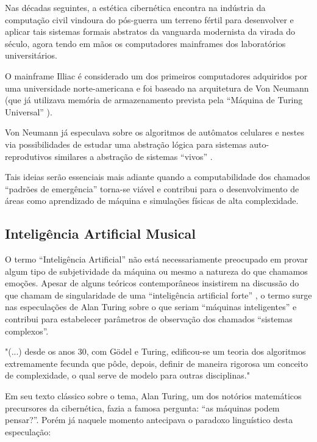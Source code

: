 \documentclass[
	12pt,				%
	openright,			%
	twoside,			%
	a4paper,			%
	english,			%
	french,				%
	spanish,			%
	brazil				%
	]{abntex2}
\begin{document}
Nas décadas seguintes, a estética cibernética encontra na indústria da computação civil vindoura do pós-guerra um terreno fértil para desenvolver e aplicar tais sistemas formais abstratos da vanguarda modernista da virada do século, agora tendo em mãos os computadores mainframes dos laboratórios universitários. 

O mainframe Illiac é considerado um dos primeiros computadores adquiridos por uma universidade norte-americana e foi baseado na arquitetura de Von Neumann (que já utilizava memória de armazenamento prevista pela “Máquina de Turing Universal” ).

Von Neumann já especulava sobre os algoritmos de autômatos celulares e nestes via possibilidades de estudar uma abstração lógica para sistemas auto-reprodutivos similares a abstração de sistemas “vivos” \cite[p. 13]{langton1997artificial}.

Tais ideias serão essenciais mais adiante quando a computabilidade dos chamados “padrões de emergência” torna-se viável e contribui para o desenvolvimento de áreas como aprendizado de máquina e simulações físicas de alta complexidade.

\subsection{Inteligência Artificial Musical}

O termo “Inteligência Artificial” não está necessariamente preocupado em provar algum tipo de subjetividade da máquina ou mesmo a natureza do que chamamos emoções. Apesar de alguns teóricos contemporâneos insistirem na discussão do que chamam de singularidade de uma “inteligência artificial forte”  \cite{kurzweil2005singularity}, o termo surge nas especulações de Alan Turing sobre o que seriam “máquinas inteligentes” \cite{turing1936computable} e contribui para estabelecer parâmetros de observação dos chamados “sistemas complexos”.

\begin{citacao}

"(...) desde os anos 30, com Gödel e Turing, edificou-se um teoria dos algoritmos extremamente fecunda que pôde, depois, definir de maneira rigorosa um conceito de complexidade, o qual serve de modelo para outras disciplinas." \cite[p. 108]{pessis1993caos}

\end{citacao}

Em seu texto clássico sobre o tema, Alan Turing, um dos notórios matemáticos precursores da cibernética, fazia a famosa pergunta: “as máquinas podem pensar?”. Porém já naquele momento antecipava o paradoxo linguístico desta especulação:
\end{document}
